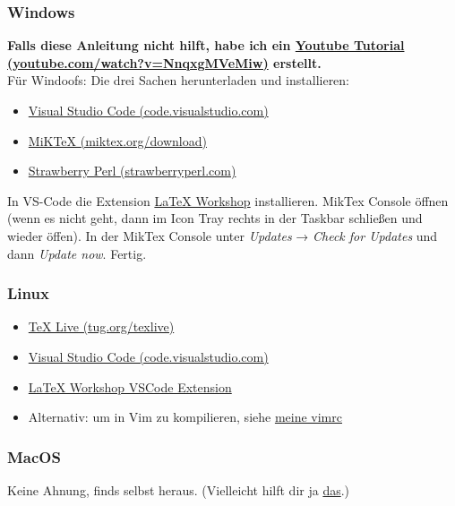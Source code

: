 \documentclass[titlepage]{article}
\begin{document}
\subsubsection{Windows}

\textbf{Falls diese Anleitung nicht hilft, habe ich ein \href{https://www.youtube.com/watch?v=NnqxgMVeMiw}{Youtube Tutorial (youtube.com/watch?v=NnqxgMVeMiw)} erstellt.}\\

Für Windoofs: Die drei Sachen herunterladen und installieren:
\begin{itemize}
	\item \href{https://code.visualstudio.com/}{Visual Studio Code (code.visualstudio.com)}
	\item \href{https://miktex.org/download}{MiKTeX (miktex.org/download)}
	\item \href{https://strawberryperl.com/}{Strawberry Perl (strawberryperl.com)}
\end{itemize}
In VS-Code die Extension \href{https://open-vsx.org/extension/James-Yu/latex-workshop}{LaTeX Workshop} installieren. MikTex Console öffnen (wenn es nicht geht, dann im Icon Tray rechts in der Taskbar schließen und wieder öffen).
In der MikTex Console unter \textit{Updates} → \textit{Check for Updates} und dann \textit{Update now}. Fertig.
\subsubsection{Linux}
\begin{itemize}
	\item \href{https://tug.org/texlive}{TeX Live (tug.org/texlive)}
	\item \href{https://code.visualstudio.com/}{Visual Studio Code (code.visualstudio.com)}
	\item \href{https://open-vsx.org/extension/James-Yu/latex-workshop}{LaTeX Workshop VSCode Extension}
	\item Alternativ: um in Vim zu kompilieren, siehe \href{https://gitlab.com/sagerer/hyprreis/-/blob/main/.vimrc}{meine vimrc}
\end{itemize}

\subsubsection{MacOS}
Keine Ahnung, finds selbst heraus.
(Vielleicht hilft dir ja \href{https://tex.stackexchange.com/questions/220/i-want-to-start-using-latex-on-mac-os-x-where-do-i-start}{das}.)
\end{document}
